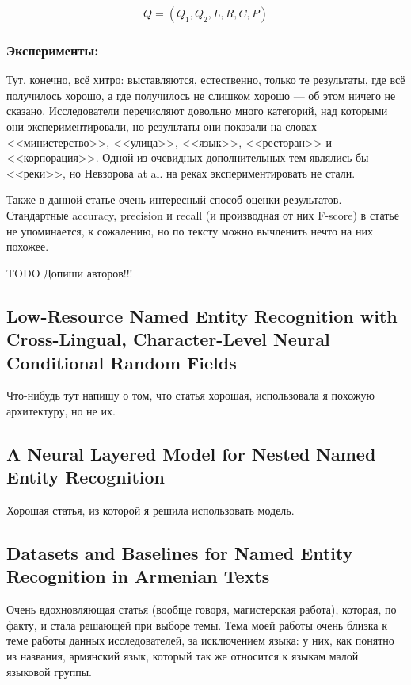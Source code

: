\[Q = (Q_1, Q_2, L, R, C, P)\]

\subsubsection{Эксперименты:}

Тут, конечно, всё хитро: выставляются, естественно, только те результаты, где всё получилось хорошо, а где получилось не слишком хорошо --- об этом ничего не сказано. Исследователи перечисляют довольно много категорий, над которыми они экспериментировали, но результаты они показали на словах <<министерство>>, <<улица>>, <<язык>>, <<ресторан>> и <<корпорация>>. Одной из очевидных дополнительных тем являлись бы <<реки>>, но Невзорова at al. на реках экспериментировать не стали.

Также в данной статье очень интересный способ оценки результатов. Стандартные accuracy, precision и recall (и производная от них F-score) в статье не упоминается, к сожалению, но по тексту можно вычленить нечто на них похожее. 

TODO Допиши авторов!!!

\subsection{Low-Resource Named Entity Recognition with Cross-Lingual, Character-Level Neural Conditional Random Fields}

Что-нибудь тут напишу о том, что статья хорошая, использовала я похожую архитектуру, но не их.

\subsection{A Neural Layered Model for Nested Named Entity Recognition}

Хорошая статья, из которой я решила использовать модель. 

\subsection{Datasets and Baselines for Named Entity Recognition in Armenian Texts}

Очень вдохновляющая статья (вообще говоря, магистерская работа), которая, по факту, и стала решающей при выборе темы. Тема моей работы очень близка к теме работы данных исследователей, за исключением языка: у них, как понятно из названия, армянский язык, который так же относится к языкам малой языковой группы.

